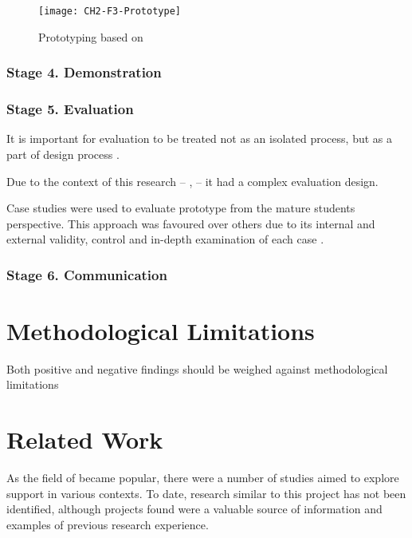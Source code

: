 \begin{figure}[htb]
\centering
\texttt{[image: CH2-F3-Prototype]}
\caption[Ptototyping]{Prototyping based on \citet*[p.~411]{Sommerville2007}}
\label{fig:prototype}
\end{figure}

\subsubsection{Stage 4. Demonstration}

\subsubsection{Stage 5. Evaluation}

It is important for evaluation to be treated not as an isolated process, but as
a part of design process \citep{Cleven2009}.

Due to the context of this research -- \LLLsn, -- it had a complex evaluation
design. 

Case studies were used to evaluate prototype from the mature students
perspective. This approach was favoured over others due to its internal and
external validity, control and in-depth examination of each case
\citep{Yin2009}.

\subsubsection{Stage 6. Communication}

\section{Methodological Limitations}
\label{sec:limits}

Both positive and negative findings should be weighed against methodological
limitations

\section{Related Work}
\label{sec:related}
As the field of \LLLs became popular, there were a number of studies aimed to
explore \LLLs support in various contexts. To date, research similar to this
project has not been identified, although projects found were a valuable source
of information and examples of previous research experience.

